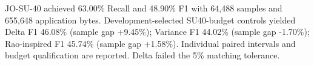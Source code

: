 JO-SU-40 achieved 63.00\% Recall and 48.90\% F1 with 64,488 samples and 655,648 application bytes. Development-selected SU40-budget controls yielded Delta F1 46.08\% (sample gap +9.45\%); Variance F1 44.02\% (sample gap -1.70\%); Rao-inspired F1 45.74\% (sample gap +1.58\%). Individual paired intervals and budget qualification are reported.
 Delta failed the 5\% matching tolerance.
